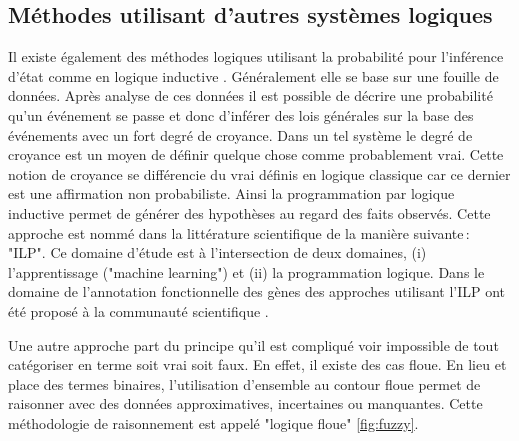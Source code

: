 \begin{refsegment}
    \subsection{Méthodes utilisant d'autres systèmes logiques }
    
    Il existe également des méthodes logiques utilisant la probabilité pour l'inférence d'état comme en logique inductive \cite{michalski1983theory,muggleton1994inductive}. Généralement elle se base sur une fouille de données. Après analyse de ces données il est possible de décrire une probabilité qu'un événement se passe et donc d'inférer des lois générales sur la base des événements avec un fort degré de croyance. Dans un tel système le degré de croyance est un moyen de définir quelque chose comme probablement vrai. Cette notion de croyance se différencie du vrai définis en logique classique car ce dernier est une affirmation non probabiliste. Ainsi la programmation par logique inductive permet de générer des hypothèses au regard des faits observés. Cette approche est nommé dans la littérature scientifique de la manière suivante : "\gls{ILP}". Ce domaine d'étude est à l'intersection de deux domaines, (i) l'apprentissage ("machine learning") et (ii) la programmation logique. Dans le domaine de l'annotation fonctionnelle des gènes des approches utilisant l'\gls{ILP} ont été proposé à la communauté scientifique \cite{clare2003predicting,king2004applying}.
    
    Une autre approche part du principe qu'il est compliqué voir impossible de tout catégoriser en terme soit vrai soit faux. En effet, il existe des cas floue. En lieu et place des termes binaires, l'utilisation d'ensemble au contour floue permet de raisonner avec des données approximatives, incertaines ou manquantes. Cette méthodologie de raisonnement est appelé "logique floue" \ref{fig:fuzzy}.
        

\end{refsegment}
